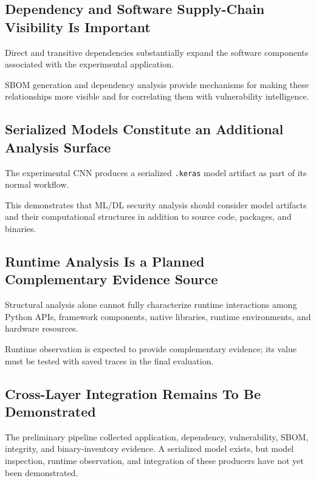 \documentclass[
  12pt,
  letterpaper,
  oneside]{report}
\begin{document}
\subsection{Dependency and Software Supply-Chain Visibility Is Important}\label{3-dependency-and-software-supply-chain-visibility-is-important}

Direct and transitive dependencies substantially expand the software
components associated with the experimental application.

SBOM generation and dependency analysis provide mechanisms for making
these relationships more visible and for correlating them with
vulnerability intelligence.

\subsection{Serialized Models Constitute an Additional Analysis Surface}\label{4-serialized-models-constitute-an-additional-analysis-surface}

The experimental CNN produces a serialized \texttt{.keras} model
artifact as part of its normal workflow.

This demonstrates that ML/DL security analysis should consider model
artifacts and their computational structures in addition to source code,
packages, and binaries.

\subsection{Runtime Analysis Is a Planned Complementary Evidence Source}\label{5-runtime-analysis-is-a-planned-complementary-evidence-source}

Structural analysis alone cannot fully characterize runtime interactions
among Python APIs, framework components, native libraries, runtime
environments, and hardware resources.

Runtime observation is expected to provide complementary evidence; its
value must be tested with saved traces in the final evaluation.

\subsection{Cross-Layer Integration Remains To Be Demonstrated}\label{6-cross-layer-integration-remains-to-be-demonstrated}

The preliminary pipeline collected application, dependency,
vulnerability, SBOM, integrity, and binary-inventory evidence. A
serialized model exists, but model inspection, runtime observation, and
integration of these producers have not yet been demonstrated.
\end{document}
